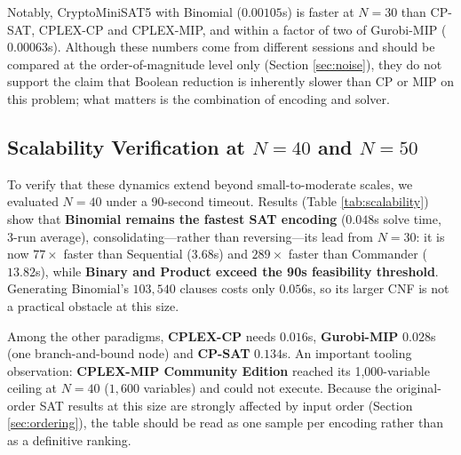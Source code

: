 \documentclass[a4paper,fleqn]{cas-sc}
\begin{document}
Notably, CryptoMiniSAT5 with Binomial ($0.00105$s) is faster at $N=30$ than CP-SAT, CPLEX-CP and CPLEX-MIP, and within a factor of two of Gurobi-MIP ($0.00063$s). Although these numbers come from different sessions and should be compared at the order-of-magnitude level only (Section \ref{sec:noise}), they do not support the claim that Boolean reduction is inherently slower than CP or MIP on this problem; what matters is the combination of encoding and solver.

\subsection{\texorpdfstring{Scalability Verification at $N=40$ and $N=50$}{Scalability Verification at N=40 and N=50}}
To verify that these dynamics extend beyond small-to-moderate scales, we evaluated $N=40$ under a 90-second timeout. Results (Table \ref{tab:scalability}) show that \textbf{Binomial remains the fastest SAT encoding} ($0.048$s solve time, 3-run average), consolidating—rather than reversing—its lead from $N=30$: it is now $77\times$ faster than Sequential ($3.68$s) and $289\times$ faster than Commander ($13.82$s), while \textbf{Binary and Product exceed the 90s feasibility threshold}. Generating Binomial's $103{,}540$ clauses costs only $0.056$s, so its larger CNF is not a practical obstacle at this size.

Among the other paradigms, \textbf{CPLEX-CP} needs $0.016$s, \textbf{Gurobi-MIP} $0.028$s (one branch-and-bound node) and \textbf{CP-SAT} $0.134$s. An important tooling observation: \textbf{CPLEX-MIP Community Edition} reached its 1,000-variable ceiling at $N=40$ ($1,600$ variables) and could not execute. Because the original-order SAT results at this size are strongly affected by input order (Section \ref{sec:ordering}), the table should be read as one sample per encoding rather than as a definitive ranking.
\end{document}
